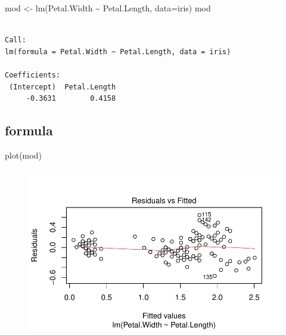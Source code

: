 \documentclass[
  letterpaper,
  DIV=11,
  numbers=noendperiod]{scrreprt}
\newenvironment{Shaded}{\begin{snugshade}}{\end{snugshade}}
\newcommand{\AttributeTok}[1]{\textcolor[rgb]{0.40,0.45,0.13}{#1}}
\newcommand{\FunctionTok}[1]{\textcolor[rgb]{0.28,0.35,0.67}{#1}}
\newcommand{\NormalTok}[1]{\textcolor[rgb]{0.00,0.23,0.31}{#1}}
\newcommand{\OtherTok}[1]{\textcolor[rgb]{0.00,0.23,0.31}{#1}}
\newcommand{\SpecialCharTok}[1]{\textcolor[rgb]{0.37,0.37,0.37}{#1}}
\begin{document}
\begin{Shaded}
\begin{Highlighting}[]
\NormalTok{mod }\OtherTok{\textless{}{-}} \FunctionTok{lm}\NormalTok{(Petal.Width }\SpecialCharTok{\textasciitilde{}}\NormalTok{ Petal.Length, }\AttributeTok{data=}\NormalTok{iris)}
\NormalTok{mod}
\end{Highlighting}
\end{Shaded}

\begin{verbatim}

Call:
lm(formula = Petal.Width ~ Petal.Length, data = iris)

Coefficients:
 (Intercept)  Petal.Length  
     -0.3631        0.4158  
\end{verbatim}

\hypertarget{formula}{%
\subsection{formula}\label{formula}}

\begin{Shaded}
\begin{Highlighting}[]
\FunctionTok{plot}\NormalTok{(mod)}
\end{Highlighting}
\end{Shaded}

\begin{figure}[H]

{\centering \includegraphics{modelling_files/figure-pdf/unnamed-chunk-3-1.pdf}

}

\end{figure}
\end{document}
